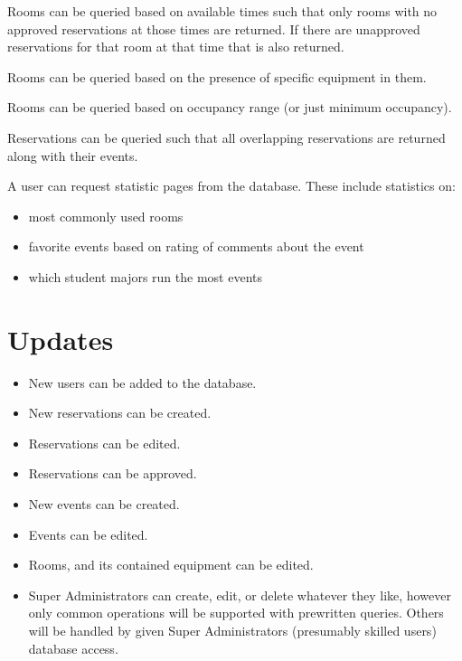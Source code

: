 \documentclass{article}
\begin{document}
Rooms can be queried based on available times such that only rooms with no approved reservations at those times are returned.
If there are unapproved reservations for that room at that time that is also returned.

Rooms can be queried based on the presence of specific equipment in them.

Rooms can be queried based on occupancy range (or just minimum occupancy).

Reservations can be queried such that all overlapping reservations are returned along with their events.

A user can request statistic pages from the database. These include statistics on:
\begin{itemize}
\item most commonly used rooms
\item favorite events based on rating of comments about the event
\item which student majors run the most events
\end{itemize}

\section{}

\section{Updates}
\begin{itemize}
\item New users can be added to the database.
\item New reservations can be created.
\item Reservations can be edited.
\item Reservations can be approved.
\item New events can be created.
\item Events can be edited.
\item Rooms, and its contained equipment can be edited.
\item Super Administrators can create, edit, or delete whatever they like,
however only common operations will be supported with prewritten queries.
Others will be handled by given Super Administrators (presumably skilled users) database access.
\end{itemize}

\section{}
\end{document}
